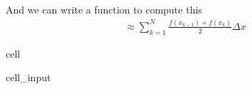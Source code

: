 \documentclass[letterpaper,10pt,english]{jupyterBook}
\begin{document}
\sphinxAtStartPar
And we can write a function to compute this
\begin{equation*}
\begin{split}
\approx \sum_{k=1}^N \frac{f(x_{k-1}) + f(x_k)}{2} \Delta x
\end{split}
\end{equation*}
\begin{sphinxuseclass}{cell}\begin{sphinxVerbatimInput}

\begin{sphinxuseclass}{cell_input}
\begin{sphinxVerbatim}[commandchars=\\\{\}]
  
      
      
      \PYG{p}{[}\PYG{p}{]}  \PYG{p}{[}\PYG{p}{]}
    
        
          \PYG{p}{[}  \PYG{p}{]}  \PYG{p}{[}\PYG{p}{]}    
        
     
\end{sphinxVerbatim}

\end{sphinxuseclass}\end{sphinxVerbatimInput}

\end{sphinxuseclass}
\end{document}
